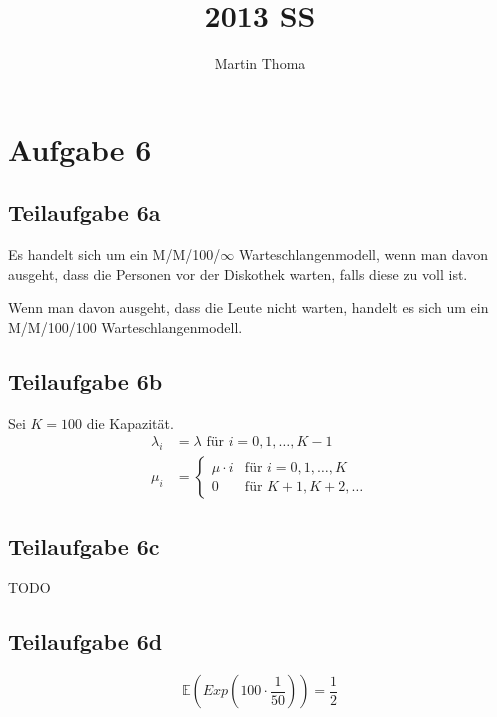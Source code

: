 \documentclass[a4paper]{scrartcl}
\begin{document}
 \title{2013 SS}
 \author{Martin Thoma}

 \setcounter{section}{1}
 \section*{Aufgabe 6}
 \subsection*{Teilaufgabe 6a}
Es handelt sich um ein M/M/100/$\infty$ Warteschlangenmodell, wenn man davon
ausgeht, dass die Personen vor der Diskothek warten, falls diese zu voll ist.

Wenn man davon ausgeht, dass die Leute nicht warten, handelt es sich um ein
M/M/100/100 Warteschlangenmodell.

\subsection*{Teilaufgabe 6b}
Sei $K=100$ die Kapazität.
\begin{align}
    \lambda_i &= \lambda \text{ für } i=0, 1, \dots, K-1\\
    \mu_i     &= \begin{cases}\mu \cdot i &\text{für } i=0, 1, \dots, K\\
                              0           &\text{für } K+1, K+2, \dots \end{cases}
\end{align}

\subsection*{Teilaufgabe 6c}
TODO

\subsection*{Teilaufgabe 6d}

\[\mathbb{E}(Exp(100 \cdot \frac{1}{50})) = \frac{1}{2}\]
\end{document}
